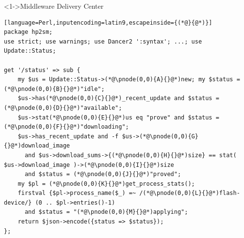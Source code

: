 \documentclass[ngerman,xcolor={table,dvipsnames},smaller,compress,hyperref={bookmarks,colorlinks},handout]{beamer}%
\begin{document}
\begin{frame}[t,fragile]

\begin{block}<1->{Middleware Delivery Center}
\scriptsize
\begin{lstlisting}[language=Perl,inputencoding=latin9,escapeinside={(*@}{@*)}]
package hp2sm;
use strict; use warnings; use Dancer2 ':syntax'; ...; use Update::Status;

get '/status' => sub {
    my $us = Update::Status->(*@\pnode(0,0){A}{}@*)new; my $status = (*@\pnode(0,0){B}{}@*)"idle";
    $us->has(*@\pnode(0,0){C}{}@*)_recent_update and $status = (*@\pnode(0,0){D}{}@*)"available";
    $us->stat(*@\pnode(0,0){E}{}@*)us eq "prove" and $status = (*@\pnode(0,0){F}{}@*)"downloading";
    $us->has_recent_update and -f $us->(*@\pnode(0,0){G}{}@*)download_image
      and $us->download_sums->{(*@\pnode(0,0){H}{}@*)size} == stat( $us->download_image )->(*@\pnode(0,0){I}{}@*)size
      and $status = (*@\pnode(0,0){J}{}@*)"proved";
    my $pl = (*@\pnode(0,0){K}{}@*)get_process_stats();
    firstval {$pl->process_name($_) =~ /(*@\pnode(0,0){L}{}@*)flash-device/} (0 .. $pl->entries()-1)
      and $status = "(*@\pnode(0,0){M}{}@*)applying";
    return $json->encode({status => $status});
};
\end{lstlisting}
\end{block}

\begin{itemize}
\end{itemize}





\end{frame}
\end{document}
